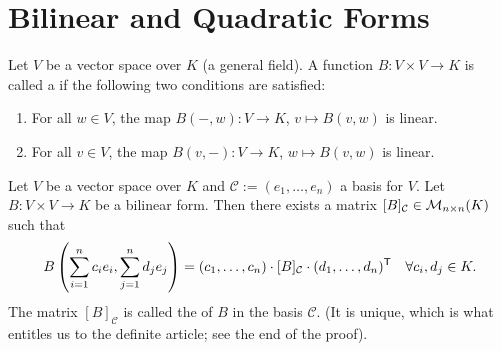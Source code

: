 \renewcommand{\thetheorem}{27.a.\arabic{theorem}}
\setcounter{theorem}{0}

\setcounter{chapter}{26}

\chapter{Bilinear and Quadratic Forms}

\begin{definition}
\label{def:bilinear_form}
Let $V$ be a vector space over $K$ (a general field). A function $B \colon V \times V \to K$ is called a  if the following two conditions are satisfied:
\begin{enumerate}[label=\textbf{(\alph*)}]
    \item For all $w \in V$, the map $B(-, w) \colon V \to K$, $v \mapsto B(v, w)$ is linear.
    \item For all $v \in V$, the map $B(v, -) \colon V \to K$, $w \mapsto B(v, w)$ is linear.
\end{enumerate}
\end{definition}

\begin{lemma}
\label{lem:matrix_rep_bilinear_form}
Let $V$ be a vector space over $K$ and $\mathcal{C} := (e_1, \dots, e_n)$ a basis for $V$. Let $B \colon V \times V \to K$ be a bilinear form. Then there exists a matrix $[B]_{\mathcal{C}} \in \mathcal{M}_{n \times n}(K)$ such that
\[
B\left(\sum_{i=1}^n c_i e_i, \sum_{j=1}^n d_j e_j\right) = (c_1, \dots, c_n) \cdot [B]_{\mathcal{C}} \cdot (d_1, \dots, d_n)^{\mathsf{T}} \quad \forall c_i, d_j \in K.
\]
The matrix $[B]_{\mathcal{C}}$ is called the  of $B$ in the basis $\mathcal{C}$. (It is unique, which is what entitles us to the definite article; see the end of the proof).
\end{lemma}

